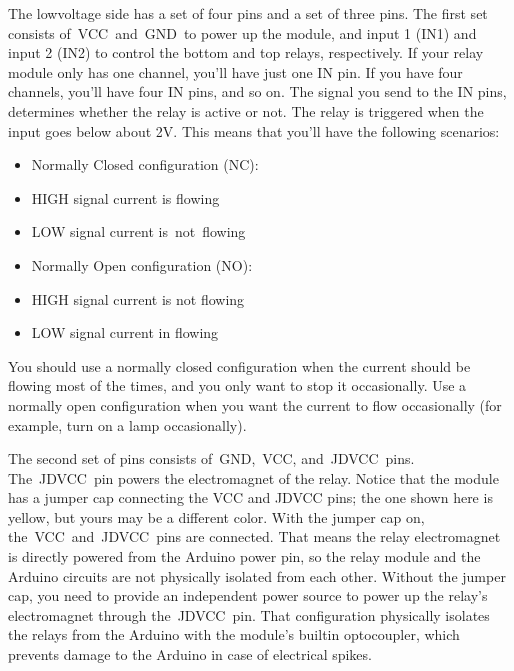 \documentclass[a4paper,11pt,english]{sphinxmanual}
\let\sphinxpxdimen\pdfpxdimen\else\newdimen\sphinxpxdimen
\begin{document}
\sphinxAtStartPar
The low\sphinxhyphen{}voltage side has a set of four pins and a set of three pins. The first set consists of VCC and GND to power up the module, and input 1 (IN1) and input 2 (IN2) to control the bottom and top relays, respectively.
If your relay module only has one channel, you’ll have just one IN pin. If you have four channels, you’ll have four IN pins, and so on.
The signal you send to the IN pins, determines whether the relay is active or not. The relay is triggered when the input goes below about 2V. This means that you’ll have the following scenarios:
\begin{itemize}
\item {} 
\sphinxAtStartPar
Normally Closed configuration (NC):

\item {} 
\sphinxAtStartPar
HIGH signal \textendash{} current is flowing

\item {} 
\sphinxAtStartPar
LOW signal \textendash{} current is not flowing

\item {} 
\sphinxAtStartPar
Normally Open configuration (NO):

\item {} 
\sphinxAtStartPar
HIGH signal \sphinxhyphen{} current is not flowing

\item {} 
\sphinxAtStartPar
LOW signal \textendash{} current in flowing

\end{itemize}

\sphinxAtStartPar
You should use a normally closed configuration when the current should be flowing most of the times, and you only want to stop it occasionally.
Use a normally open configuration when you want the current to flow occasionally (for example, turn on a lamp occasionally).

\sphinxAtStartPar
{}

\noindent{\hspace*{\fill}\sphinxincludegraphics[width=400\sphinxpxdimen]{{relay_4}.png}\hspace*{\fill}}

\sphinxAtStartPar
The second set of pins consists of GND, VCC, and JD\sphinxhyphen{}VCC pins. The JD\sphinxhyphen{}VCC pin powers the electromagnet of the relay. Notice that the module has a jumper cap connecting the VCC and JD\sphinxhyphen{}VCC pins; the one shown here is yellow, but yours may be a different color.
With the jumper cap on, the VCC and JD\sphinxhyphen{}VCC pins are connected. That means the relay electromagnet is directly powered from the Arduino power pin, so the relay module and the Arduino circuits are not physically isolated from each other.
Without the jumper cap, you need to provide an independent power source to power up the relay’s electromagnet through the JD\sphinxhyphen{}VCC pin. That configuration physically isolates the relays from the Arduino with the module’s built\sphinxhyphen{}in optocoupler, which prevents damage to the Arduino in case of electrical spikes.
\end{document}

